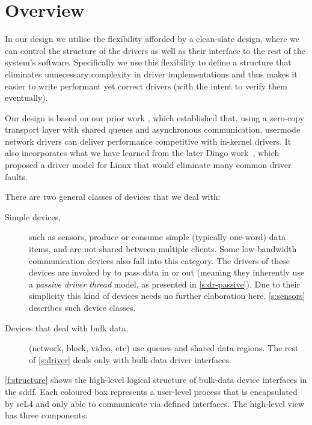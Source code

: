 \documentclass[a4paper,12pt]{report}
\begin{document}
\section{Overview}\label{s:dr-overview}

In our design we utilise the flexibility afforded by a clean-slate
design, where we can control the structure of the drivers as well as
their interface to the rest of the system's software.
Specifically we use this flexibility to define a
structure that eliminates unnecessary complexity in driver
implementations and thus makes it easier to write performant yet
correct drivers (with the intent to verify them eventually).

Our design is based on our prior work
\citep{Leslie_CFGGMPSEH_05}, which established that, using a zero-copy
transport layer with shared queues and asynchronous communication, usermode network
drivers can deliver performance competitive with in-kernel drivers. It also
incorporates what we have learned from the later Dingo
work~\citep{Ryzhyk_CKH_09}, which proposed a driver model for Linux
that would eliminate many common driver faults.

There are two general classes of devices that we deal with:
\begin{description}
\item[Simple devices,] such as sensors, produce or consume simple
  (typically one-word) data items, and are not shared between multiple
  clients. Some low-bandwidth communication devices also fall into
  this category. The drivers of these devices are invoked by
   to pass data in or out (meaning they inherently use
  a \emph{passive driver thread} model, as presented in
  \autoref{s:dr-passive}).  Due to their simplicity this kind of
  devices needs no further elaboration here.  \autoref{s:sensors}
  describes such device classes.
\item[Devices that deal with bulk data,] (network, block, video, etc) use queues and
  shared data regions.  The rest of \autoref{s:driver} deals only with
  bulk-data driver interfaces.
\end{description}

\autoref{f:structure} shows the high-level logical structure of
bulk-data device
interfaces in the \gls{sddf}. Each coloured box represents a user-level
process that is encapsulated by seL4 and only able to communicate via
defined interfaces. The high-level view has three components:
\end{document}
